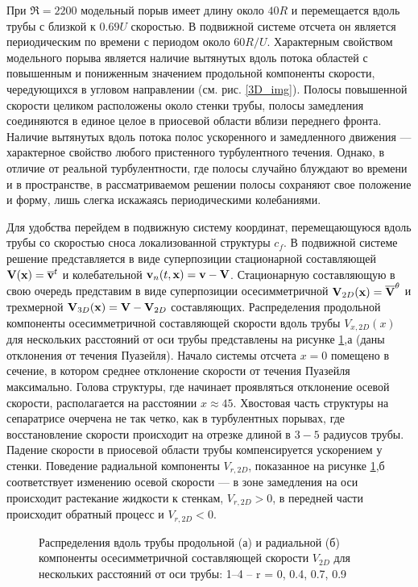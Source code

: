При $\Re=2200$ модельный порыв имеет длину около $40R$ и перемещается вдоль трубы с близкой к $0.69U$ скоростью. В подвижной системе отсчета он является периодическим по времени с периодом около $60 R/U$. Характерным свойством модельного порыва является наличие вытянутых вдоль потока областей с повышенным и пониженным значением продольной компоненты скорости, чередующихся в угловом направлении (см. рис. \ref{3D_img}). Полосы повышенной скорости целиком расположены около стенки трубы, полосы замедления соединяются в единое целое в приосевой области вблизи переднего фронта. Наличие вытянутых вдоль потока полос ускоренного и замедленного движения --- характерное свойство любого пристенного турбулентного течения. Однако, в отличие от реальной турбулентности, где полосы случайно блуждают во времени и в пространстве, в рассматриваемом решении полосы сохраняют свое положение и форму, лишь слегка искажаясь периодическими колебаниями. 

Для удобства перейдем в подвижную систему координат, перемещающуюся вдоль трубы со скоростью сноса локализованной структуры $c_f$. В подвижной системе решение представляется в виде суперпозиции стационарной составляющей $\mathbf{V}(\mathbf{x}) = \overline{\mathbf{v}}^t$ и колебательной $\mathbf{v}_n(t,\mathbf{x}) = \mathbf{v} - \mathbf{V}$. Стационарную составляющую в свою очередь представим в виде суперпозиции осесимметричной $\mathbf{V}_{2D}(\mathbf{x}) = \overline{\mathbf{V}}^{\theta}$ и трехмерной $\mathbf{V}_{3D}(\mathbf{x})=\mathbf{V} - \mathbf{V}_{2D}$ составляющих. Распределения продольной компоненты осесимметричной составляющей скорости вдоль трубы $V_{x,2D}(x)$ для нескольких расстояний от оси трубы представлены на рисунке \ref{U2D_pic},а (даны отклонения от течения Пуазейля). Начало системы отсчета $x=0$ помещено в сечение, в котором среднее отклонение скорости от течения Пуазейля максимально. Голова структуры, где начинает проявляться отклонение осевой скорости, располагается на расстоянии $x \approx 45$. Хвостовая часть структуры на сепаратрисе очерчена не так четко, как в турбулентных порывах, где восстановление скорости происходит на отрезке длиной в $3-5$ радиусов трубы.  Падение скорости в приосевой области трубы компенсируется ускорением у стенки. Поведение радиальной компоненты $V_{r,2D}$, показанное на рисунке \ref{U2D_pic},б соответствует изменению осевой скорости --- в зоне замедления на оси происходит растекание жидкости к стенкам, $V_{r,2D}>0$, в передней части происходит обратный процесс и $V_{r,2D}<0$.

\begin{figure}[h]
\caption{Распределения вдоль трубы продольной (а) и радиальной (б) компоненты осесимметричной составляющей скорости $V_{2D}$ для нескольких расстояний от оси
трубы: 1–4 – r = 0, 0.4, 0.7, 0.9}
\label{U2D_pic}
\end{figure}


